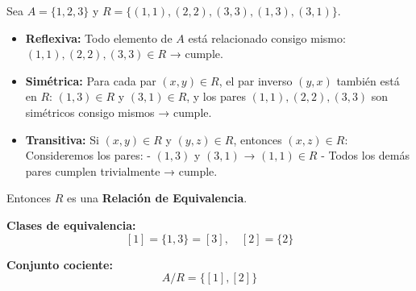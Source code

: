 \documentclass[a4paper,12pt]{article}
\begin{document}
\begin{ejemplo}[title=Ejemplo 1: Relación Explícita]
Sea \(A = \{1,2,3\}\) y  
\(R = \{(1,1),(2,2),(3,3),(1,3),(3,1)\}\).  

\begin{itemize}
    \item \textbf{Reflexiva:} Todo elemento de \(A\) está relacionado consigo mismo:  
    \((1,1),(2,2),(3,3) \in R\) → cumple.
    
    \item \textbf{Simétrica:} Para cada par \((x,y) \in R\), el par inverso \((y,x)\) también está en \(R\):  
    \((1,3) \in R \) y \((3,1) \in R\), y los pares \((1,1),(2,2),(3,3)\) son simétricos consigo mismos → cumple.
    
    \item \textbf{Transitiva:} Si \((x,y) \in R\) y \((y,z) \in R\), entonces \((x,z) \in R\):  
    Consideremos los pares:  
    - \((1,3)\) y \((3,1)\) → \((1,1) \in R\)  
    - Todos los demás pares cumplen trivialmente → cumple.
\end{itemize}

Entonces $R$ es una \textbf{Relación de Equivalencia}.

\vspace{0.5em}

\textbf{Clases de equivalencia:}  
\[
[1] = \{1,3\} = [3], \quad [2] = \{2\}
\]

\textbf{Conjunto cociente:}  
\[
A/R = \{[1],[2]\}
\]
\end{ejemplo}
\end{document}
